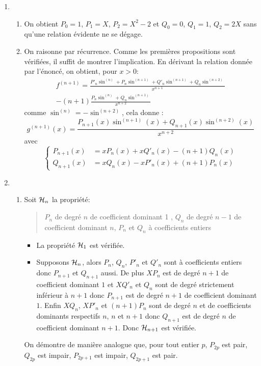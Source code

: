 \begin{enumerate}
  \item
\begin{enumerate}
  \item On obtient $P_0=1$, $P_1=X$, $P_2= X^2-2$ et $Q_0=0$, $Q_1=1$, $Q_2=2X$ sans qu'une relation évidente ne se dégage.
  \item On raisonne par récurrence. Comme les premières propositions sont vérifiées, il suffit de montrer l'implication.
En d\'erivant la relation donn\'ee par l'\'enonc\'e, on obtient, pour $x>0$:
\begin{multline*}
f^{(n+1)} 
= \frac{P'_n\sin^{(n)}+P_n\sin^{(n+1)} +Q'_n\sin^{(n+1)} +Q_n\sin^{(n+2)}}{x^{n+1}} \\
 -(n+1)\frac{P_n\sin^{(n)}+ Q_n\sin^{(n+1)}}{x^{n+2}}
\end{multline*}
comme $\sin^{(n)} = -\sin^{(n+2)}$, cela donne :
\begin{displaymath}
g^{(n+1)}(x)=  \frac{P_{n+1}(x)\sin^{(n+1)}(x) + Q_{n+1}(x)\sin^{(n+2)}(x)}{x^{n+2}}  
\end{displaymath}
avec
\begin{displaymath}
\left\lbrace 
  \begin{aligned}
P_{n+1}(x) &= xP_n(x)+xQ'_n(x)-(n+1)Q_n(x) \\
Q_{n+1}(x) &= xQ_n(x)-xP'_n(x)+(n+1)P_n(x)
  \end{aligned}
\right. 
\end{displaymath}
\end{enumerate}

  \item
\begin{enumerate}
  \item Soit ${\cal H}_n$ la propri\'et\'e: 
\begin{quote}\og $P_n$ de degr\'e $n$ de coefficient dominant 1 , $Q_n$ de degr\'e $n-1$ de coefficient dominant $n$, $P_n$ et $Q_n$ à coefficients entiers\fg
\end{quote}
 \begin{itemize}
 \item La propriété ${\cal H}_1$ est vérifiée.
 \item Supposons ${\cal H}_n$, alors $P_n$, $Q_n$, $P'_{n}$ et $Q'_{n}$ sont à coefficients entiers donc $P_{n+1}$ et $Q_{n+1}$ aussi.\newline 
De plus $XP_n$ est de degr\'e $n+1$ de coefficient dominant $1$ et $XQ'_n$ et $Q_n$ sont de degr\'e strictement inf\'erieur à $n+1$ donc $P_{n+1}$ est de degr\'e $n+1$ de coefficient dominant $1$.\newline
Enfin  $XQ_n$, $XP'_n$ et $(n+1)P_n$ sont de degr\'e $n$ et de coefficients dominants respectifs $n$, $n$ et $n+1$ donc $Q_{n+1}$ est de degr\'e $n$ de coefficient dominant $n+1$.\newline
Donc ${\cal H}_{n+1}$ est vérifiée.
\end{itemize}
On d\'emontre de mani\`ere analogue que, pour tout entier $p$, $P_{2p}$ est pair, $Q_{2p}$ est impair, $P_{2p+1}$ est impair, $Q_{2p+1}$ est pair.


\end{enumerate}
\end{enumerate}
